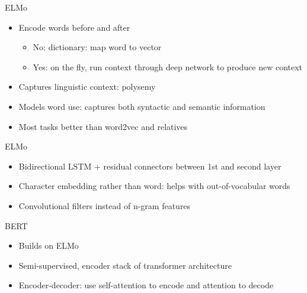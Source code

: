 \documentclass[t,aspectratio=169]{beamer}
\begin{document}
\begin{frame}{ELMo}
  \begin{itemize}
  \item Encode words before and after 
    \begin{itemize}
    \item No: dictionary: map word to vector
    \item Yes: on the fly, run context through deep network to produce
      new context
    \end{itemize}
  \item Captures linguistic context: polysemy
  \item Models word use: captures both syntactic and semantic
    information
  \item Most tasks better than word2vec and relatives 
  \end{itemize}
\end{frame}

\begin{frame}{ELMo}
  \begin{itemize}
  \item Bidirectional LSTM + residual connectors between 1st and
    second layer
  \item Character embedding rather than word: helps with
    out-of-vocabular words
  \item Convolutional filters instead of n-gram features
  \end{itemize}

\end{frame}

\begin{frame}{BERT}
  \begin{itemize}
  \item Builds on ELMo
  \item Semi-supervised, encoder stack of transformer architecture
  \item Encoder-decoder: use self-attention to encode and attention to decode
  \end{itemize}
\end{frame}
\end{document}
